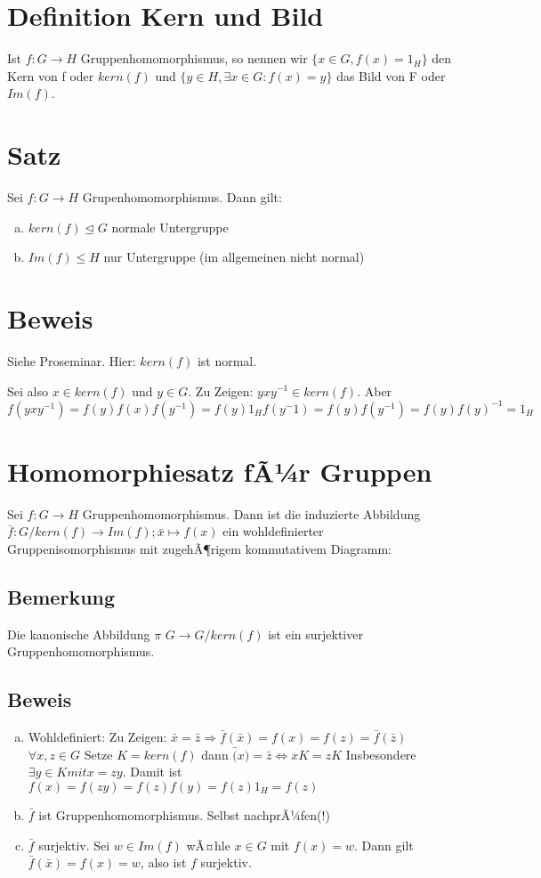 \documentclass[12pt,a4paper,ngerman]{scrreprt}
\begin{document}
\section{Definition Kern und Bild}
Ist $f: G \to H$ Gruppenhomomorphismus, so nennen wir $\{x \in G, f(x) = 1_H\}$ den Kern von f oder $kern(f)$ und
$\{y \in H, \exists x \in G : f(x) = y\}$ das Bild von F oder $Im(f)$.

\section{Satz}
Sei $f: G \to H$ Grupenhomomorphismus. Dann gilt:
\begin{enumerate}[(a)]
\item $kern(f) \trianglelefteq G$ normale Untergruppe
\item $Im(f) \leq H$ nur Untergruppe (im allgemeinen nicht normal)
\end{enumerate}

\section{Beweis}
Siehe Proseminar. Hier: $kern(f)$ ist normal.

Sei also $x \in kern(f)$ und $y \in G$. Zu Zeigen: $yxy^{-1}\in kern(f)$. Aber $f(yxy^{-1}) = f(y)f(x)f(y^{-1}) = f(y) 1_H f(y^-1) = f(y)f(y^{-1}) = f(y)f(y)^{-1} = 1_H$

\section{Homomorphiesatz fÃ¼r Gruppen}
Sei $f: G \to H$ Gruppenhomomorphismus. Dann ist die induzierte Abbildung $\bar{f}: G/kern(f) \to Im(f); \bar{x} \mapsto f(x)$
ein wohldefinierter Gruppenisomorphismus mit zugehÃ¶rigem kommutativem Diagramm:

\subsection{Bemerkung}
Die kanonische Abbildung $\pi$ $G \to G/kern(f) $ ist ein surjektiver Gruppenhomomorphismus.

\subsection{Beweis}
\begin{enumerate}[(a)]
\item Wohldefiniert: Zu Zeigen: $\bar{x} = \bar{z} \Rightarrow \bar{f}(\bar{x}) = f(x) = f(z) = \bar{f}(\bar{z})$ $\forall x,z \in G$
Setze $ K = kern(f)$ dann $ \bar(x) = \bar{z} \Leftrightarrow  xK = zK $ Insbesondere $ \exists y \in K mit x = zy$. 
Damit ist $f(x) = f(zy) = f(z)f(y) = f(z) 1_H = f(z)$

\item $\bar{f}$ ist Gruppenhomomorphismus. Selbst nachprÃ¼fen(!)

\item $\bar{f}$ surjektiv. 
Sei $w \in Im(f)$ wÃ¤hle $x \in G$ mit $f(x) = w$. 
Dann gilt $\bar{f}(\bar{x}) = f(x) = w$, also ist $f$ surjektiv.

\end{enumerate}
\end{document}
